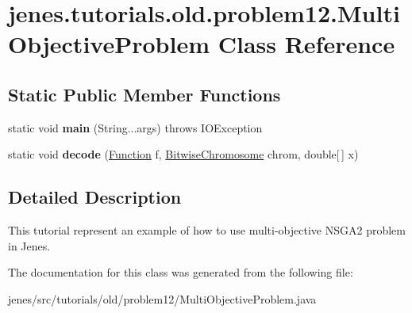 \hypertarget{classjenes_1_1tutorials_1_1old_1_1problem12_1_1_multi_objective_problem}{\section{jenes.\-tutorials.\-old.\-problem12.\-Multi\-Objective\-Problem Class Reference}
\label{classjenes_1_1tutorials_1_1old_1_1problem12_1_1_multi_objective_problem}
}
\subsection*{Static Public Member Functions}
\begin{DoxyCompactItemize}
\item 
\hypertarget{classjenes_1_1tutorials_1_1old_1_1problem12_1_1_multi_objective_problem_aa56b8e189215e753714d1ed16fdf1075}{static void {\bfseries main} (String...\-args)  throws I\-O\-Exception }\label{classjenes_1_1tutorials_1_1old_1_1problem12_1_1_multi_objective_problem_aa56b8e189215e753714d1ed16fdf1075}

\item 
\hypertarget{classjenes_1_1tutorials_1_1old_1_1problem12_1_1_multi_objective_problem_a793287d33c3ae22a258312881dbed2a3}{static void {\bfseries decode} (\hyperlink{classjenes_1_1tutorials_1_1old_1_1problem12_1_1_function}{Function} f, \hyperlink{classjenes_1_1chromosome_1_1_bitwise_chromosome}{Bitwise\-Chromosome} chrom, double\mbox{[}$\,$\mbox{]} x)}\label{classjenes_1_1tutorials_1_1old_1_1problem12_1_1_multi_objective_problem_a793287d33c3ae22a258312881dbed2a3}

\end{DoxyCompactItemize}


\subsection{Detailed Description}
This tutorial represent an example of how to use multi-\/objective N\-S\-G\-A2 problem in Jenes. 

The documentation for this class was generated from the following file\-:\begin{DoxyCompactItemize}
\item 
jenes/src/tutorials/old/problem12/Multi\-Objective\-Problem.\-java\end{DoxyCompactItemize}
